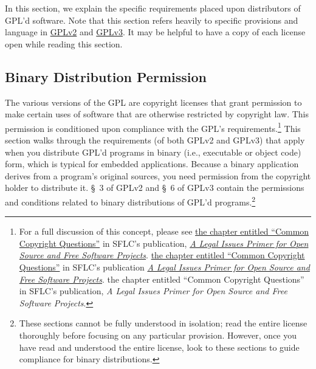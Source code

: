 \documentclass[letterpaper]{fixme}
\begin{document}
In this section, we explain the specific requirements placed upon
distributors of GPL'd software.  Note that this section refers heavily to
specific provisions and language in
\href{http://www.gnu.org/licenses/old-licenses/gpl-2.0.html#section3}{GPLv2}
and \href{http://www.fsf.org/licensing/licenses/gpl.html#section6}{GPLv3}.
It may be helpful to have a copy of each license open while reading this
section.

\subsection{Binary Distribution Permission}
\label{binary-distribution-permission}


The various versions of the GPL are copyright licenses that grant
permission to make certain uses of software that are otherwise restricted
by copyright law.  This permission is conditioned upon compliance with the
GPL's requirements.\footnote{For a full discussion of this concept, please see
\ifpdf
\href{http://www.softwarefreedom.org/resources/2008/foss-primer.html\#x1-40002}{the
  chapter entitled ``Common Copyright Questions''} in SFLC's publication,
\href{http://www.softwarefreedom.org/resources/2008/foss-primer.pdf}{\textit{A
    Legal Issues Primer for Open Source and Free Software Projects}}.
\else
\ifx \generateHTML \isGeneratingHTML
\href{http://www.softwarefreedom.org/resources/2008/foss-primer.html\#x1-40002}{the
  chapter entitled ``Common Copyright Questions''} in SFLC's publication
\href{http://www.softwarefreedom.org/resources/2008/foss-primer.html}{\textit{A
    Legal Issues Primer for Open Source and Free Software Projects}}.
\else
the chapter entitled ``Common Copyright Questions'' in SFLC's publication,
\textit{A Legal Issues Primer for Open Source and Free Software
  Projects}.
\fi
\fi
}
This section walks through the requirements (of both GPLv2 and GPLv3) that
apply when you distribute GPL'd programs in binary (i.e., executable or
object code) form, which is typical for embedded applications.  Because a
binary application derives from a program's original sources, you need
permission from the copyright holder to distribute it.  \S~3 of GPLv2 and
\S~6 of GPLv3 contain the permissions and conditions related to binary
distributions of GPL'd programs.\footnote{These sections cannot be fully
  understood in isolation; read the entire license thoroughly before
  focusing on any particular provision.  However, once you have read and
  understood the entire license, look to these sections to guide
  compliance for binary distributions.}
\end{document}
